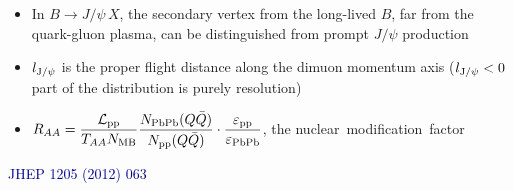 \documentclass[compress]{beamer}
\begin{document}
\begin{frame}
\begin{itemize}
\item In $B \to J/\psi \, X$, the secondary vertex from the long-lived $B$, far from the quark-gluon plasma, can be distinguished from prompt $J/\psi$ production
\item $l_{\mbox{\scriptsize J/$\psi$}}$ is the proper flight distance along the dimuon momentum axis ($l_{\mbox{\scriptsize J/$\psi$}} < 0$ part of the distribution is purely resolution)
\item $\displaystyle R_{AA} = \frac{\mathcal{L}_{\mbox{\scriptsize pp}}}{T_{AA}N_{\mbox{\scriptsize MB}}} \frac{N_{\mbox{\scriptsize PbPb}}(Q\bar{Q})}{N_{\mbox{\scriptsize pp}}(Q\bar{Q})} \cdot \frac{\varepsilon_{\mbox{\scriptsize pp}}}{\varepsilon_{\mbox{\scriptsize PbPb}}}$, the \mbox{nuclear modification factor\hspace{-1 cm}}
\end{itemize}

\vspace{-0.3 cm}
\hfill \textcolor{darkblue}{\scriptsize JHEP 1205 (2012) 063}
\end{frame}
\end{document}
